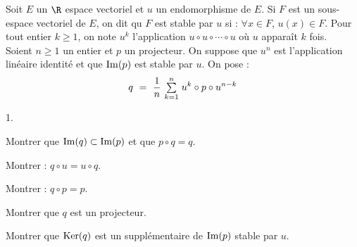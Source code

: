 \documentclass[11pt]{article}%
\begin{document}
\noindent
Soit $E$ un $\R$ espace vectoriel et $u$ un endomorphisme de $E$. Si 
$F$ est un sous-espace vectoriel de $E$, on dit qu $F$ est stable par 
$u$ si : $\forall x \in F$, $u(x) \in F$. Pour tout entier $k \geq 1$, 
on note $u^k$ l'application $u \circ u \circ \cdots \circ u$ où $u$ 
apparaît $k$ fois.\\
Soient $n \geq 1$ un entier et $p$ un projecteur. On suppose que $u^n$ 
est l'application linéaire identité et que $\operatorname{Im}(p)$ est stable par $u$. 
On pose :
\[
  q \ = \ \dfrac{1}{n} \ \Sum{k=1}{n} u^k \circ p \circ u^{n-k}
\]
\begin{noliste}{1.}
  \item Montrer que $\operatorname{Im}(q) \subset \operatorname{Im}(p)$ et que $p \circ q = q$.
  
  \item Montrer : $q \circ u = u \circ q$.
  
  \item Montrer : $q \circ p =p$.
  
  \item Montrer que $q$ est un projecteur.
  
  \item Montrer que $\operatorname{Ker}(q)$ est un supplémentaire de $\operatorname{Im}(p)$ stable 
  par $u$.
\end{noliste}
\end{document}
